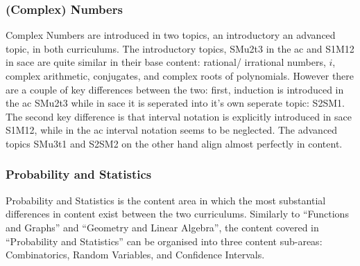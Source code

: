\documentclass[twoside,12pt,a4paper]{report}
\begin{document}
\subsubsection{(Complex) Numbers}
Complex Numbers are introduced in two topics, an introductory an advanced topic, in both curriculums. The introductory topics, SMu2t3 in the \gls{ac} and S1M12 in \gls{sace} are quite similar in their base content: rational/ irrational numbers, $i$, complex arithmetic, conjugates, and complex roots of polynomials. However there are a couple of key differences between the two: first, induction is introduced in the \gls{ac} SMu2t3 while in \gls{sace} it is seperated into it's own seperate topic: S2SM1. The second key difference is that interval notation is explicitly introduced in \gls{sace} S1M12, while in the \gls{ac} interval notation seems to be neglected. The advanced topics SMu3t1 and S2SM2 on the other hand align almost perfectly in content.


\subsubsection{Probability and Statistics}
Probability and Statistics is the content area in which the most substantial differences in content exist between the two curriculums. Similarly to ``Functions and Graphs'' and ``Geometry and Linear Algebra'', the content covered in ``Probability and Statistics'' can be organised into three content sub-areas: Combinatorics, Random Variables, and Confidence Intervals. 
\end{document}
